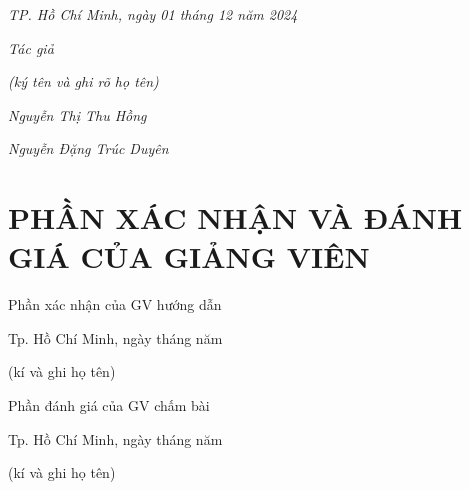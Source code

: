 \documentclass[13pt]{article}
\begin{document}
\begin{flushright}
    \textit{TP. Hồ Chí Minh, ngày 01 tháng 12 năm 2024}\\      
    \begin{adjustwidth}{10cm}{}
    \textit{Tác giả}\\
    \end{adjustwidth} 
    
    \begin{adjustwidth}{8cm}{}
	\textit{(ký tên và ghi rõ họ tên)}\\
    \end{adjustwidth} 
    
    \begin{adjustwidth}{8.5cm}{}
    \textit{Nguyễn Thị Thu Hồng}\\
    \end{adjustwidth} 
    
    \begin{adjustwidth}{8cm}{}
    \textit{Nguyễn Đặng Trúc Duyên}
    \end{adjustwidth} 
\end{flushright}


\newpage
\section*{PHẦN XÁC NHẬN VÀ ĐÁNH GIÁ CỦA GIẢNG VIÊN}
Phần xác nhận của GV hướng dẫn\\
\vspace{3cm}
\begin{flushright}
    Tp. Hồ Chí Minh, ngày     tháng   năm   \\
	\begin{adjustwidth}{10cm}{}
	(kí và ghi họ tên)\\
    \end{adjustwidth}
    
\end{flushright}

    
Phần đánh giá của GV chấm bài\\
\vspace{3cm}
\begin{flushright}
    Tp. Hồ Chí Minh, ngày     tháng   năm   \\
    \begin{adjustwidth}{10cm}{}
	(kí và ghi họ tên)\\
    \end{adjustwidth}
    
\end{flushright}
\end{document}
